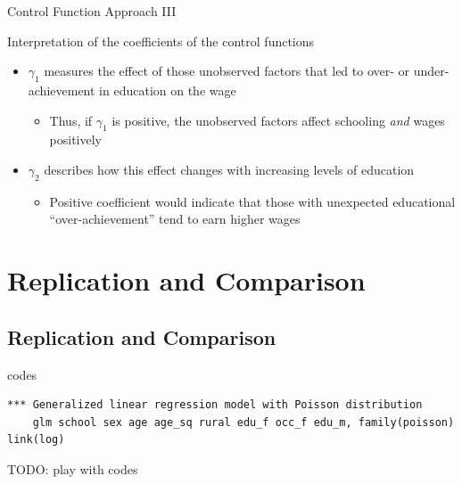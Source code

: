 \documentclass[10pt,ignorenonframetext,]{beamer}
\providecommand{\tightlist}{%
  \setlength{\itemsep}{0pt}\setlength{\parskip}{0pt}}
\begin{document}
\begin{frame}{Control Function Approach III}
\protect\hypertarget{control-function-approach-iii}{}

Interpretation of the coefficients of the control functions

\begin{itemize}
\tightlist
\item
  \(\gamma_1\) measures the effect of those unobserved factors that led
  to over- or under-achievement in education on the wage

  \begin{itemize}
  \tightlist
  \item
    Thus, if \(\gamma_1\) is positive, the unobserved factors affect
    schooling \emph{and} wages positively
  \end{itemize}
\item
  \(\gamma_2\) describes how this effect changes with increasing levels
  of education

  \begin{itemize}
  \tightlist
  \item
    Positive coefficient would indicate that those with unexpected
    educational ``over-achievement'' tend to earn higher wages
  \end{itemize}
\end{itemize}

\end{frame}

\hypertarget{replication-and-comparison}{%
\section{Replication and Comparison}\label{replication-and-comparison}}

\hypertarget{replication-and-comparison-1}{%
\subsection{Replication and
Comparison}\label{replication-and-comparison-1}}

\begin{frame}[fragile]{codes}
\protect\hypertarget{codes}{}

\begin{verbatim}
*** Generalized linear regression model with Poisson distribution
    glm school sex age age_sq rural edu_f occ_f edu_m, family(poisson) link(log)
\end{verbatim}

TODO: play with codes

\end{frame}
\end{document}
